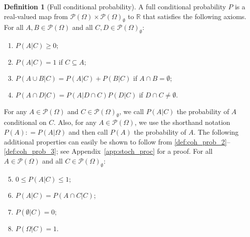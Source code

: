 \documentclass[10pt,a4paper]{paper}
\theoremstyle{definition}
\newtheorem{definition}{Definition}
\newcommand{\reals}{\mathbb{R}}
\newcommand{\paths}{\Omega}
\newcommand{\power}{\mathcal{P}(\paths)}
\newcommand{\nonemptypower}{\power_{\emptyset}}
\newcommand{\coloneqq}{:\!=}
\begin{document}
\begin{definition}[Full conditional probability]\label{def:cond_prob}
A full conditional probability $P$ is a real-valued map from $\power\times\nonemptypower$ to $\reals$ that satisfies the following axioms. For all $A,B\in\power$ and all \mbox{$C,D\in\nonemptypower$}:
\vspace{5pt}

\begin{enumerate}[label=F\arabic*:,ref=F\arabic*]
\item
$P(A\vert C)\geq 0$;\label{def:coh_prob_2}
\item
$P(A\vert C)=1$ if $C\subseteq A$;\label{def:coh_prob_1}
\item
$P(A\cup B\vert C)=P(A\vert C)+P(B\vert C)$ if $A\cap B=\emptyset$;\label{def:coh_prob_3}
\item
$P(A\cap D\vert C)=P(A\vert D\cap C)P(D\vert C)$ if $D\cap C\neq\emptyset$.\label{def:coh_prob_6}
\end{enumerate}
\vspace{5pt}

\noindent
For any $A\in\power$ and $C\in\nonemptypower$, we call $P(A\vert C)$ the probability of $A$ conditional on $C$. Also, for any $A\in\power$, we use the shorthand notation $P(A)\coloneqq P(A\vert\paths)$ and then call $P(A)$ the probability of $A$.
The following additional properties can easily be shown to follow from \ref{def:coh_prob_2}--\ref{def:coh_prob_3}; see Appendix~\ref{app:stoch_proc} for a proof. For all $A\in\power$ and all $C\in\nonemptypower$:
\vspace{5pt}
\begin{enumerate}[label=F\arabic*:,ref=F\arabic*]
\setcounter{enumi}{4}
\item
$0\leq P(A\vert C)\leq 1$;\label{def:coh_prob_2b}
\item
$P(A\vert C)=P(A\cap C\vert C)$;\label{def:coh_prob_7}
\item
$P(\emptyset\vert C)=0$;\label{def:coh_prob_8}
\item
$P(\Omega\vert C)=1$.\label{def:coh_prob_5}
\end{enumerate}
\vspace{2pt}
\end{definition}
\end{document}
